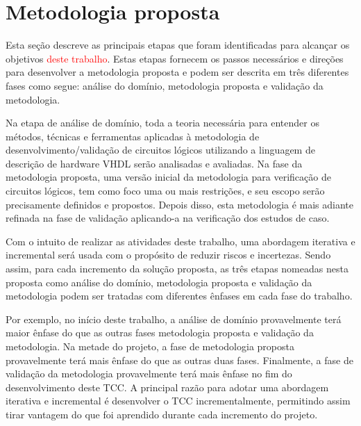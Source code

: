 \section{Metodologia proposta}

Esta seção descreve as principais etapas que foram identificadas para alcançar os objetivos \textcolor{red}{deste trabalho}. Estas etapas fornecem os passos necessários e direções para desenvolver a metodologia proposta e podem ser descrita em três diferentes fases como segue: análise do domínio, metodologia proposta e validação da metodologia.

Na etapa de análise de domínio, toda a teoria necessária para entender os métodos, técnicas e ferramentas aplicadas à metodologia de desenvolvimento/validação de circuitos lógicos utilizando a linguagem de descrição de hardware VHDL serão analisadas e avaliadas. Na fase da metodologia proposta, uma versão inicial da metodologia para verificação de circuitos lógicos, tem como foco uma ou mais restrições, e seu escopo serão precisamente definidos e propostos. Depois disso, esta metodologia é mais adiante refinada na fase de validação aplicando-a na verificação dos estudos de caso.

Com o intuito de realizar as atividades deste trabalho, uma abordagem iterativa e incremental será usada com o propósito de reduzir riscos e incertezas. Sendo assim, para cada incremento da solução proposta, as três etapas nomeadas nesta proposta como análise do domínio, metodologia proposta e validação da metodologia podem ser tratadas com diferentes ênfases em cada fase do trabalho.

Por exemplo, no início deste trabalho, a análise de domínio provavelmente terá maior ênfase do que as outras fases metodologia proposta e validação da metodologia. Na metade do projeto, a fase de metodologia proposta provavelmente terá mais ênfase do que as outras duas fases. Finalmente, a fase de validação da metodologia provavelmente terá mais ênfase no fim do desenvolvimento deste TCC. A principal razão para adotar uma abordagem iterativa e incremental é desenvolver o TCC incrementalmente, permitindo assim tirar vantagem do que foi aprendido durante cada incremento do projeto.


